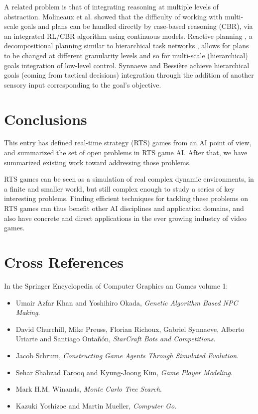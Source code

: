\documentclass{llncs}
\begin{document}
A related problem is that  of integrating reasoning at multiple levels
of abstraction.  Molineaux et  al. \cite{Molineaux08} showed  that the
difficulty of working with multi-scale  goals and plans can be handled
directly  by  case-based reasoning  (CBR),  via  an integrated  RL/CBR
algorithm     using    continuous     models.    Reactive     planning
\cite{WeberCig10}, a decompositional  planning similar to hierarchical
task networks  \cite{HTNPlanning}, allows for  plans to be  changed at
different  granularity levels  and so  for multi-scale  (hierarchical)
goals  integration of  low-level  control.  Synnaeve and  Bessi\`{e}re
\cite{SynnaeveMicroCig11}  achieve  hierarchical  goals  (coming  from
tactical  decisions)  integration  through  the  addition  of  another
sensory input corresponding to the goal's objective.


\section*{Conclusions}

This entry has defined real-time strategy (RTS) games from an AI point of view, and summarized the set of open problems in RTS game AI. After that, we have summarized existing work toward addressing those problems.

RTS games can be seen as a simulation of real complex dynamic environments, in a finite and smaller world, but still complex enough to study a series of key interesting problems. Finding efficient techniques for tackling these problems on RTS games can thus benefit other  AI disciplines and  application domains, and  also have concrete and direct applications in the ever growing industry of video games.

\section*{Cross References}
In the Springer Encyclopedia of Computer Graphics an Games volume 1:
\begin{itemize}
\item Umair Azfar Khan and Yoshihiro Okada, {\it Genetic Algorithm Based NPC Making}.
\item David Churchill, Mike Preuss, Florian Richoux, Gabriel Synnaeve,
  Alberto Uriarte and Santiago Ontañón, {\it StarCraft Bots and Competitions}.
\item Jacob Schrum, {\it Constructing Game Agents Through Simulated Evolution}.
\item Sehar Shahzad Farooq and Kyung-Joong Kim, {\it Game Player Modeling}.
\item Mark H.M. Winands, {\it Monte Carlo Tree Search}.
\item Kazuki Yoshizoe and Martin Mueller, {\it Computer Go}.
\end{itemize}




\end{document}

